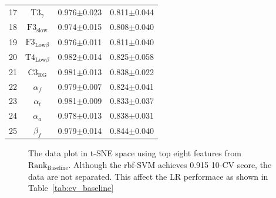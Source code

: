 \documentclass[pdflatex,sn-mathphys]{sn-jnl}%
\theoremstyle{thmstyleone}%
\theoremstyle{thmstyletwo}%
\theoremstyle{thmstylethree}%
\begin{document}
\begin{table}[h!]
\begin{tabular}{r|ccc}
  17 &            $\text{T3}_{\gamma}$ &          0.976$\pm$0.023 &          0.811$\pm$0.044 \\
  18 &         $\text{F3}_\text{slow}$ &          0.974$\pm$0.015 &          0.808$\pm$0.040 \\
  19 &   $\text{F3}_{\text{Low}\beta}$ &          0.976$\pm$0.011 &          0.811$\pm$0.040 \\
  20 &   $\text{T4}_{\text{Low}\beta}$ &          0.982$\pm$0.014 &          0.825$\pm$0.058 \\
  21 &         $\text{C3}_{\text{RG}}$ &          0.981$\pm$0.013 &          0.838$\pm$0.022 \\
  22 &                    $\alpha_{f}$ &          0.979$\pm$0.007 &          0.824$\pm$0.041 \\
  23 &                    $\alpha_{t}$ &          0.981$\pm$0.009 &          0.833$\pm$0.037 \\
  24 &                    $\alpha_{a}$ &          0.978$\pm$0.013 &          0.838$\pm$0.031 \\
  25 &                     $\beta_{f}$ &          0.979$\pm$0.014 &          0.844$\pm$0.040 \\
\hline
\end{tabular}
\end{table}

\begin{figure}[h!]
  \centering
  \caption{The data plot in t-SNE space using top eight features from $\text{Rank}_{\text{Baseline}}$. Although the rbf-SVM achieves 0.915 10-CV score, the data are not separated. This affect the LR performace as shown in Table~\ref{tab:cv_baseline}}
  \label{fig:t-sne-bseline-8}
\end{figure}
\end{document}
